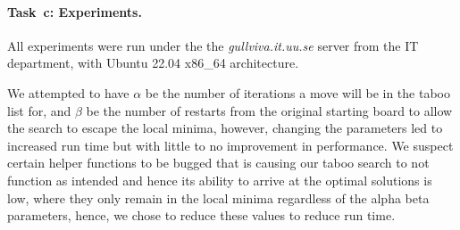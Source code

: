 
\paragraph{Task~c: Experiments.}
All experiments were run under the the \textit{gullviva.it.uu.se} server from the IT department, with Ubuntu 22.04 x86\_64 architecture. 

We attempted to have $\alpha$ be the number of iterations a move will be in the taboo list for, and $\beta$ be the number of restarts from the original starting board to allow the search to escape the local minima, however, changing the parameters led to increased run time but with little to no improvement in performance. We suspect certain helper functions to be bugged that is causing our taboo search to not function as intended and hence its ability to arrive at the optimal solutions is low, where they only remain in the local minima regardless of the alpha beta parameters, hence, we chose to reduce these values to reduce run time.
%
\newcommand{\TimeoutSLS}{\todo{300.0}}  %
\newcommand{\RunsSLS}{\todo{5}}         %
%
%

